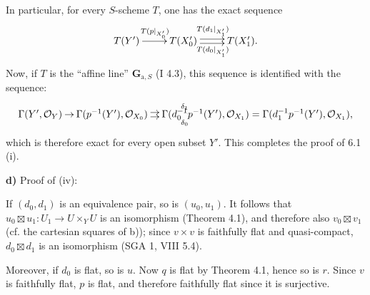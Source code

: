 In particular, for every $S$-scheme $T$, one has the exact sequence
\[
\xymatrix{T(Y')\ar[r]^{T(p|_{X'_0})}&T(X'_0)\ar@<.5ex>[r]^{T(d_1|_{X'_1})}\ar@<-.5ex>[r]_{T(d_0|_{X'_1})}&T(X'_1).}
\]
Now, if $T$ is the ``affine line'' $\mathbf G_{\mathrm a,S}$ (I 4.3), this sequence is identified with the sequence:
\[
\xymatrix@C=.8em{\Gamma(Y',\OO_Y)\ar[r]&\Gamma(p^{-1}(Y'),\OO_{X_0})\ar@<.5ex>[r]^{\delta_1}\ar@<-.5ex>[r]_{\delta_0}&\Gamma(d_0^{-1}p^{-1}(Y'),\OO_{X_1})=\Gamma(d_1^{-1}p^{-1}(Y'),\OO_{X_1}),}
\]
which is therefore exact for every open subset $Y'$. This completes the proof of 6.1 (i).

\textbf{d)} Proof of (iv):

If $(d_0,d_1)$ is an equivalence pair, so is $(u_0,u_1)$. It follows that $u_0\boxtimes u_1:U_1\to U\times_YU$ is an isomorphism (Theorem 4.1), and therefore also $v_0\boxtimes v_1$ (cf. the cartesian squares of b)); since $v\times v$ is faithfully flat and quasi-compact, $d_0\boxtimes d_1$ is an isomorphism (SGA 1, VIII 5.4).

Moreover, if $d_0$ is flat, so is $u$. Now $q$ is flat by Theorem 4.1, hence so is $r$. Since $v$ is faithfully flat, $p$ is flat, and therefore faithfully flat since it is surjective.
